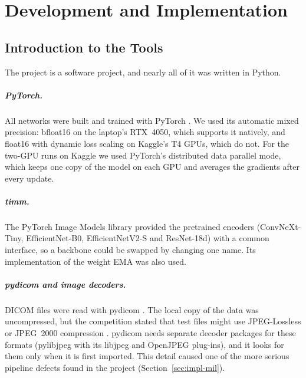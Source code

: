 \chapter[DEVELOPMENT AND IMPLEMENTATION]{Development and Implementation}
\label{ch:impl}

\section{Introduction to the Tools}

The project is a software project, and nearly all of it was written in Python.

\paragraph{PyTorch.} All networks were built and trained with PyTorch \cite{paszke2019pytorch}. We used its automatic mixed precision: bfloat16 on the laptop's RTX~4050, which supports it natively, and float16 with dynamic loss scaling \cite{micikevicius2018amp} on Kaggle's T4 GPUs, which do not. For the two-GPU runs on Kaggle we used PyTorch's distributed data parallel mode, which keeps one copy of the model on each GPU and averages the gradients after every update.

\paragraph{timm.} The PyTorch Image Models library \cite{wightman2019timm} provided the pretrained encoders (ConvNeXt-Tiny, EfficientNet-B0, EfficientNetV2-S and ResNet-18d) with a common interface, so a backbone could be swapped by changing one name. Its implementation of the weight EMA was also used.

\paragraph{pydicom and image decoders.} DICOM files were read with pydicom \cite{mason_pydicom}. The local copy of the data was uncompressed, but the competition stated that test files might use JPEG-Lossless or JPEG~2000 compression \cite{dicom_standard}. pydicom needs separate decoder packages for these formats (pylibjpeg with its libjpeg and OpenJPEG plug-ins), and it looks for them only when it is first imported. This detail caused one of the more serious pipeline defects found in the project (Section~\ref{sec:impl-mil}).

